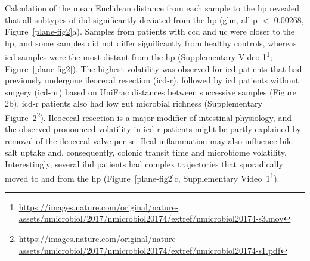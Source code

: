 Calculation of the mean Euclidean distance from each sample to the \gls{hp} revealed that all subtypes of \gls{ibd} significantly deviated from the \gls{hp} (\gls{glm}, all p $<$ 0.00268, Figure~\ref{plane-fig2}a). Samples from patients with \gls{ccd} and \gls{uc} were closer to the \gls{hp}, and some samples did not differ significantly from healthy controls, whereas \gls{icd} samples were the most distant from the \gls{hp} (Supplementary Video 1\footnote{\label{supVideo2}\url{https://images.nature.com/original/nature-assets/nmicrobiol/2017/nmicrobiol20174/extref/nmicrobiol20174-s3.mov}}; Figure~\ref{plane-fig2}). The highest volatility was observed for \gls{icd} patients that had previously undergone ileocecal resection (\gls{icd}-r), followed by \gls{icd} patients without surgery (\gls{icd}-nr) based on UniFrac distances between successive samples (Figure 2b). \gls{icd}-r patients also had low gut microbial richness (Supplementary Figure~2\footnote{\label{suppdfFig}\url{https://images.nature.com/original/nature-assets/nmicrobiol/2017/nmicrobiol20174/extref/nmicrobiol20174-s1.pdf}}). Ileocecal resection is a major modifier of intestinal physiology, and the observed pronounced volatility in \gls{icd}-r patients might be partly explained by removal of the ileocecal valve per se. Ileal inflammation may also influence bile salt uptake and, consequently, colonic transit time and microbiome volatility. Interestingly, several \gls{ibd} patients had complex trajectories that sporadically moved to and from the \gls{hp} (Figure~\ref{plane-fig2}c, Supplementary Video~1\textsuperscript{\ref{supVideo2}}).

